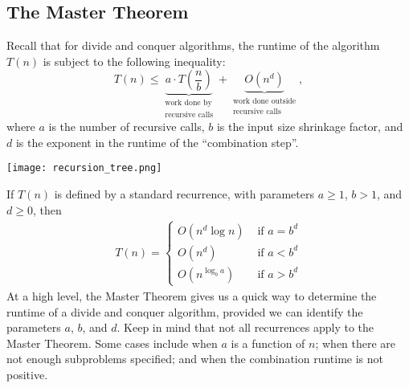 \documentclass[11pt]{article}
\begin{document}
\subsection{The Master Theorem}
Recall that for divide and conquer algorithms, the runtime of the algorithm $T(n)$ is subject to the following inequality:
\begin{equation}
    T(n) \leq \underbrace{a \cdot T \left( \frac{n}{b} \right)}_{\substack{\text{work done by} \\ \text{recursive calls}}} + \underbrace{O(n^d)}_{\substack{\text{work done outside} \\ \text{recursive calls}}},
\end{equation}
where $a$ is the number of recursive calls, $b$ is the input size shrinkage factor, and $d$ is the exponent in the runtime of the ``combination step''.
\begin{center}
    \texttt{[image: recursion\_tree.png]}
\end{center}
If $T(n)$ is defined by a standard recurrence, with parameters $a \geq 1$, $b > 1$, and $d \geq 0$, then 
\begin{gather} \label{MasterThm}
    T(n) = \begin{cases}
        O(n^d \log n) & \text{ if } a = b^d \\
        O(n^d) & \text{ if } a < b^d \\
        O(n^{\log_b a}) & \text{ if } a > b^d
    \end{cases}
\end{gather}
At a high level, the Master Theorem gives us a quick way to determine the runtime of a divide and conquer algorithm, provided we can identify the parameters $a$, $b$, and $d$. Keep in mind that not all recurrences apply to the Master Theorem. Some cases include when $a$ is a function of $n$; when there are not enough subproblems specified; and when the combination runtime is not positive.
\end{document}
